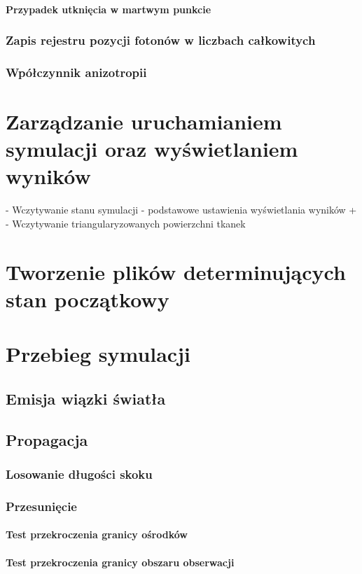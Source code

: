 \paragraph{Przypadek utknięcia w martwym punkcie}
\subsubsection{Zapis rejestru pozycji fotonów w liczbach całkowitych}
\subsubsection{Wpółczynnik anizotropii}

\section{Zarządzanie uruchamianiem symulacji oraz wyświetlaniem wyników}
- Wczytywanie stanu symulacji
- podstawowe ustawienia wyświetlania wyników
+    - Wczytywanie triangularyzowanych powierzchni tkanek

\section{Tworzenie plików determinujących stan początkowy}

\section{Przebieg symulacji}
\subsection{Emisja wiązki światła}
\subsection{Propagacja}
\subsubsection{Losowanie długości skoku}
\subsubsection{Przesunięcie}
\paragraph{Test przekroczenia granicy ośrodków}
\paragraph{Test przekroczenia granicy obszaru obserwacji}
